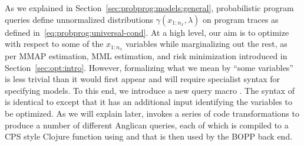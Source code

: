 
As we explained in Section~\ref{sec:probprog:models:general}, probabilistic program queries
define unnormalized distributions $\gamma(x_{1:n_x},\lambda)$ on program traces
 as defined in~\eqref{eq:probprog:universal-cond}.
At a high level, our aim is to optimize with respect to some of the $x_{1:n_x}$ variables while marginalizing out
the rest, as per MMAP estimation, MML estimation, and risk minimization introduced in
Section~\ref{sec:opt:intro}.
However, formalizing what we mean by ``some variables'' is less trivial than it would
first appear and will require specialist syntax for specifying models.  To this end,
we introduce a new query macro .  The syntax of  is identical to  except 
that it has an additional input identifying the variables to be optimized.  As we will
explain later,  invokes a series of code transformations to produce a number
of different Anglican queries, each of which is compiled to a CPS style Clojure function using
\query and that is then used by the BOPP back end.

